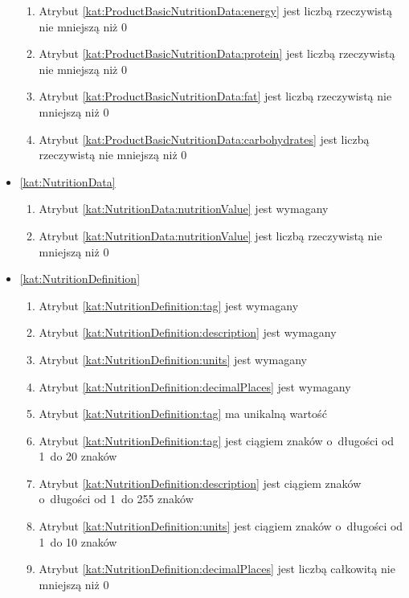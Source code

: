 \begin{itemize}[label={\textbf{Ograniczenia dla}}, wide, labelwidth=!, labelindent=0pt]
\begin{enumerate}[label={\textbf{OGR/1/\protect\twodigits{\arabic{enumi}}}}, wide, labelwidth=!, align=left, leftmargin=3cm, resume]
        \item Atrybut \ref{kat:ProductBasicNutritionData:energy} jest liczbą rzeczywistą nie mniejszą niż 0
        \item Atrybut \ref{kat:ProductBasicNutritionData:protein} jest liczbą rzeczywistą nie mniejszą niż 0
        \item Atrybut \ref{kat:ProductBasicNutritionData:fat} jest liczbą rzeczywistą nie mniejszą niż 0
        \item Atrybut \ref{kat:ProductBasicNutritionData:carbohydrates} jest liczbą rzeczywistą nie mniejszą niż 0
    \end{enumerate}

    \item\ref{kat:NutritionData}\mynobreakpar
    \begin{enumerate}[label={\textbf{OGR/1/\protect\twodigits{\arabic{enumi}}}}, wide, labelwidth=!, align=left, leftmargin=3cm, resume]
        \item Atrybut \ref{kat:NutritionData:nutritionValue} jest wymagany

        \item Atrybut \ref{kat:NutritionData:nutritionValue} jest liczbą rzeczywistą nie mniejszą niż 0
    \end{enumerate}

    \item\ref{kat:NutritionDefinition}\mynobreakpar
    \begin{enumerate}[label={\textbf{OGR/1/\protect\twodigits{\arabic{enumi}}}}, wide, labelwidth=!, align=left, leftmargin=3cm, resume]
        \item Atrybut \ref{kat:NutritionDefinition:tag} jest wymagany
        \item Atrybut \ref{kat:NutritionDefinition:description} jest wymagany
        \item Atrybut \ref{kat:NutritionDefinition:units} jest wymagany
        \item Atrybut \ref{kat:NutritionDefinition:decimalPlaces} jest wymagany

        \item Atrybut \ref{kat:NutritionDefinition:tag} ma unikalną wartość

        \item Atrybut \ref{kat:NutritionDefinition:tag} jest ciągiem znaków o~długości od 1~do 20 znaków
        \item Atrybut \ref{kat:NutritionDefinition:description} jest ciągiem znaków o~długości od 1~do 255 znaków
        \item Atrybut \ref{kat:NutritionDefinition:units} jest ciągiem znaków o~długości od 1~do 10 znaków
        \item Atrybut \ref{kat:NutritionDefinition:decimalPlaces} jest liczbą całkowitą nie mniejszą niż 0
    \end{enumerate}


\end{itemize}
